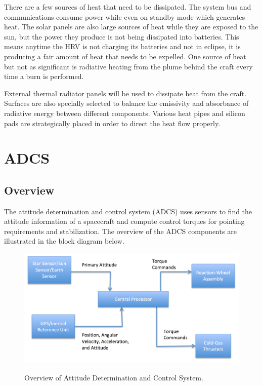 \documentclass[paper=letter, fontsize=11pt]{scrartcl} %
\numberwithin{equation}{section} %
\numberwithin{figure}{section} %
\numberwithin{table}{section} %
\begin{document}
There are a few sources of heat that need to be dissipated. The system bus and communications consume power while even on standby mode which generates heat. The solar panels are also large sources of heat while they are exposed to the sun, but the power they produce is not being dissipated into batteries. This means anytime the HRV is not charging its batteries and not in eclipse, it is producing a fair amount of heat that needs to be expelled. One source of heat but not as significant is radiative heating from the plume behind the craft every time a burn is performed.

External thermal radiator panels will be used to dissipate heat from the craft. Surfaces are also specially selected to balance the emissivity and absorbance of radiative energy between different components. Various heat pipes and silicon pads are strategically placed in order to direct the heat flow properly.



\section{ADCS}
\subsection {Overview}
The attitude determination and control system (ADCS) uses sensors to find the attitude information of a spacecraft and compute control torques for pointing requirements and stabilization. The overview of the ADCS components are illustrated in the block diagram below.
\begin{figure}[H]
    \centering
    \includegraphics[width=1\textwidth]{GNCHardware.png}
    \label{fig:adcs}
    \caption{Overview of Attitude Determination and Control System.}
\end{figure}
\end{document}
